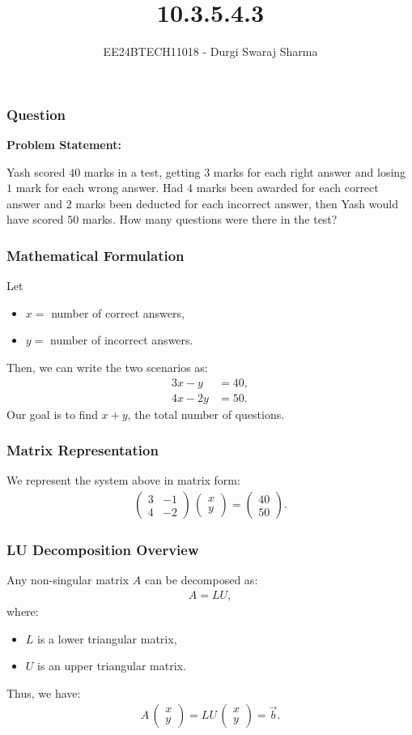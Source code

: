 \documentclass{beamer}
\title{10.3.5.4.3}
\author{EE24BTECH11018 - Durgi Swaraj Sharma}
\date{}
\newcommand{\myvec}[1]{\ensuremath{\begin{pmatrix}#1\end{pmatrix}}}
\numberwithin{equation}{section}
\begin{document}
\frame{\titlepage}

\begin{frame}
\frametitle{Question}
\textbf{Problem Statement:}

Yash scored $40$ marks in a test, getting $3$ marks for each right answer and losing $1$ mark for each wrong answer. Had $4$ marks been awarded for each correct answer and $2$ marks been deducted for each incorrect answer, then Yash would have scored $50$ marks. How many questions were there in the test?
\end{frame}

\begin{frame}
\frametitle{Mathematical Formulation}
Let 
\begin{itemize}
    \item $x =$ number of correct answers,
    \item $y =$ number of incorrect answers.
\end{itemize}
Then, we can write the two scenarios as:
\begin{align}
3x - y &= 40, \\
4x - 2y &= 50.
\end{align}
Our goal is to find $x+y$, the total number of questions.
\end{frame}

\begin{frame}
\frametitle{Matrix Representation}
We represent the system above in matrix form:
\begin{align}
\myvec{3 & -1\\ 4 & -2}\,\myvec{x \\ y} = \myvec{40 \\ 50}.
\end{align}
\end{frame}

\begin{frame}
\frametitle{LU Decomposition Overview}
Any non-singular matrix $A$ can be decomposed as:
\begin{align}
A = LU,
\end{align}
where:
\begin{itemize}
    \item $L$ is a lower triangular matrix,
    \item $U$ is an upper triangular matrix.
\end{itemize}
Thus, we have:
\begin{align}
A\,\myvec{x \\ y} = LU\,\myvec{x \\ y} = \vec{b}.
\end{align}
\end{frame}
\end{document}
